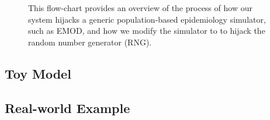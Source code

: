 \documentclass{article}
\newcommand{\bg}[1]{~{{[{\it \textcolor{red}{{\bf BG:} #1}}]}}}
\begin{document}
\begin{figure}
  \label{fig:how}
  \caption{This flow-chart provides an overview of the process of how our system hijacks a generic population-based epidemiology simulator, such as EMOD, and how we modify the simulator to 
  to hijack the random number generator (RNG).}

  \end{figure}


\subsection{Toy Model}
\subsection{Real-world Example}
\label{sec:casestudy}
\end{document}
